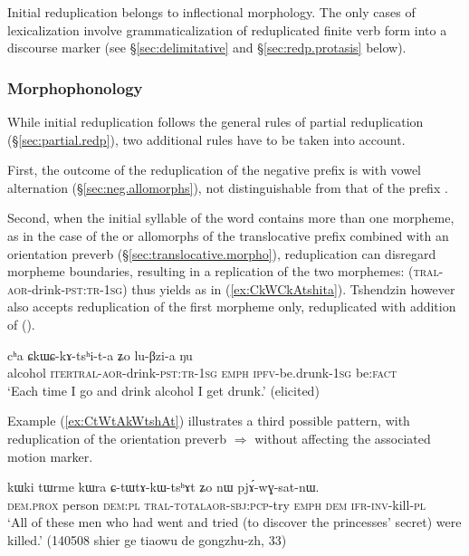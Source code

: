 Initial reduplication belongs to inflectional morphology. The only cases of lexicalization involve grammaticalization of reduplicated finite verb form into a discourse marker  (see §\ref{sec:delimitative} and §\ref{sec:redp.protasis} below).
 
 \subsubsection{Morphophonology} \label{sec:initial.redp.morpho}
While initial reduplication follows the general rules of partial reduplication (§\ref{sec:partial.redp}), two additional rules have to be taken into account. 

First, the outcome of the reduplication of the negative prefix  is  with vowel alternation (§\ref{sec:neg.allomorphs}), not distinguishable from that of the prefix .

Second, when the initial syllable of the word contains more than one morpheme, as in the case of the  or  allomorphs of the translocative prefix combined with an orientation preverb (§\ref{sec:translocative.morpho}), reduplication can disregard morpheme boundaries, resulting in a replication of the  two morphemes:  (\textsc{tral}-\textsc{aor}-drink-\textsc{pst}:\textsc{tr}-\textsc{1sg}) thus yields  as in  (\ref{ex:CkWCkAtshita}). Tshendzin however also accepts reduplication of the first morpheme only, reduplicated with addition of   ().
 
\begin{exe}
\ex \label{ex:CkWCkAtshita}
\gll cʰa ɕkɯ\redp{}ɕ-kɤ-tsʰi-t-a ʑo lu-βzi-a ŋu \\
alcohol \textsc{iter}\redp{}\textsc{tral}-\textsc{aor}-drink-\textsc{pst}:\textsc{tr}-\textsc{1sg} \textsc{emph} \textsc{ipfv}-be.drunk-\textsc{1sg} be:\textsc{fact} \\
\glt `Each time I go and drink alcohol I get drunk.' (elicited)
\end{exe}

Example (\ref{ex:CtWtAkWtshAt}) illustrates a third possible pattern, with reduplication of the orientation preverb  $\Rightarrow$  without affecting the associated motion marker.

\begin{exe}
\ex \label{ex:CtWtAkWtshAt}
\gll kɯki tɯrme kɯra ɕ-tɯ\redp{}tɤ-kɯ-tsʰɤt ʑo nɯ pjɤ́-wɣ-sat-nɯ. \\
\textsc{dem}.\textsc{prox} person \textsc{dem}:\textsc{pl} \textsc{tral}-\textsc{total}\redp{}\textsc{aor}-\textsc{sbj}:\textsc{pcp}-try \textsc{emph} \textsc{dem} \textsc{ifr}-\textsc{inv}-kill-\textsc{pl} \\
\glt `All of these men who had went and tried (to discover the princesses' secret) were killed.' (140508 shier ge tiaowu de gongzhu-zh, 33)
\end{exe}

